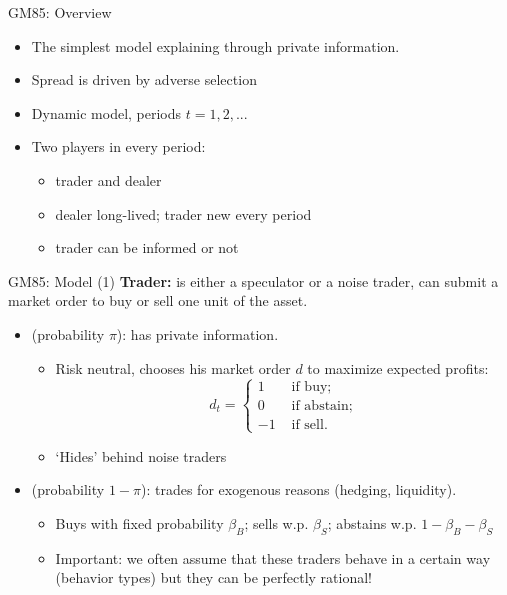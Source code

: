 \documentclass[english,10pt
,aspectratio=169
]{beamer}
\begin{document}
\begin{frame}{GM85: Overview}
	\begin{itemize}
		\item The simplest model explaining  through private information.
		\item Spread is driven by adverse selection
		\item Dynamic model, periods $t = 1,2,...$
		\item Two players in every period:
		\begin{itemize}
			\item trader and dealer
			\item \alert{dealer} long-lived; trader new every period
			\item \alert{trader} can be informed or not
		\end{itemize}
	\end{itemize}
\end{frame}



\begin{frame}{GM85: Model (1)}
	\textbf{Trader:} is either a speculator or a noise trader, can submit a market order to buy or sell one unit of the asset.
	\begin{itemize}
		\item {} (probability $\pi$): has private information.
		\begin{itemize}
			\item Risk neutral, chooses his market order $d$ to maximize expected profits:
			\begin{equation*}
				d_t= \left\{
				\begin{aligned}
				1	& \text{ if buy}; \\
				0	& \text{ if abstain}; \\
				-1	& \text{ if sell}.
				\end{aligned}
				\right.
			\end{equation*}
			\item `Hides' behind noise traders
		\end{itemize}
		\item {} (probability $1-\pi$): trades for exogenous reasons (hedging, liquidity).
		\begin{itemize}
			\item Buys with fixed probability $\beta_B$; sells w.p. $\beta_S$; abstains w.p. $1-\beta_B - \beta_S$
			\item \alert{Important}: we often assume that these traders behave in a certain way (behavior types) but they can be perfectly rational!
		\end{itemize}
	\end{itemize}
\end{frame}
\end{document}
